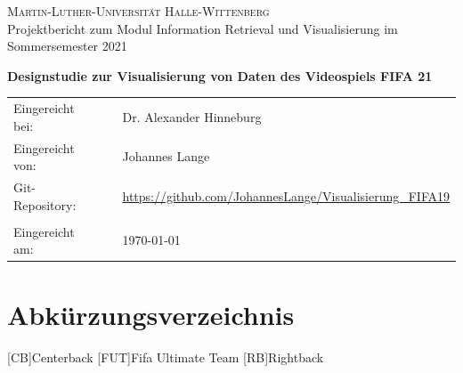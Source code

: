 \documentclass[usegeometry=true]{scrartcl}
\begin{document}

\begin{titlepage}
	\begin{center}
		\large{\textsc{Martin-Luther-Universität Halle-Wittenberg}}\\
				

		Projektbericht zum Modul Information Retrieval und Visualisierung im Sommersemester 2021
	\end{center}

	\begin{center}
		\Large
		\textbf{Designstudie zur Visualisierung von Daten des Videospiels FIFA 21}
	\end{center}

	\vskip 1cm

	\vskip 0.75cm

	\begin{center}
		\begin{tabular}{lll}
			Eingereicht bei:& & Dr. Alexander Hinneburg\\
			Eingereicht von:  & & Johannes Lange \\
			Git-Repository: & & \url{https://github.com/JohannesLange/Visualisierung_FIFA19}\\
			& & \\
			Eingereicht am: & & \today
		\end{tabular}
	\end{center}

\end{titlepage}




\newpage
\tableofcontents
\newpage

\clearpage
{}
\listoffigures

\section*{Abkürzungsverzeichnis}\label{AV}
	\begin{acronym}
	[CB]{Centerback}
	[FUT]{Fifa Ultimate Team}
	[RB]{Rightback}
	\end{acronym}
\newpage
\end{document}
